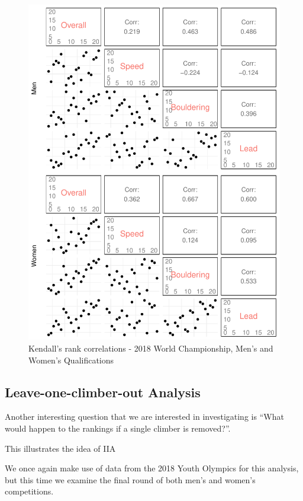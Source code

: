 \documentclass[12pt]{article}
\begin{document}
\begin{figure}[H]
\centering
\includegraphics{draft_files/figure-latex/unnamed-chunk-9-1.pdf}
\caption{Kendall's rank correlations - 2018 World Championship, Men's
and Women's Qualifications}
\end{figure}

\hypertarget{leave-one-climber-out-analysis}{%
\subsection{Leave-one-climber-out
Analysis}\label{leave-one-climber-out-analysis}}

Another interesting question that we are interested in investigating is
``What would happen to the rankings if a single climber is removed?''.

This illustrates the idea of IIA

We once again make use of data from the 2018 Youth Olympics for this
analysis, but this time we examine the final round of both men's and
women's competitions.
\end{document}
